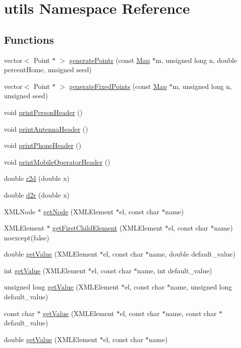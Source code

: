\hypertarget{namespaceutils}{}\section{utils Namespace Reference}
\label{namespaceutils}
\subsection*{Functions}
\begin{DoxyCompactItemize}
\item 
vector$<$ Point $\ast$ $>$ \hyperlink{namespaceutils_a16e957d5c26b39c840f6e109dd19d45d}{generate\+Points} (const \hyperlink{class_map}{Map} $\ast$m, unsigned long n, double percent\+Home, unsigned seed)
\item 
vector$<$ Point $\ast$ $>$ \hyperlink{namespaceutils_acd746b43155fa3033001f28a91a71cec}{generate\+Fixed\+Points} (const \hyperlink{class_map}{Map} $\ast$m, unsigned long n, unsigned seed)
\item 
void \hyperlink{namespaceutils_a1978a6ccb2360773215aba027d8b6f08}{print\+Person\+Header} ()
\item 
void \hyperlink{namespaceutils_a2080e7db5afc5bb1b4c9ef5336f78ccb}{print\+Antenna\+Header} ()
\item 
void \hyperlink{namespaceutils_a7633a4dfe509a009f4e02850b03ba1e4}{print\+Phone\+Header} ()
\item 
void \hyperlink{namespaceutils_a207e9d12cc075f601c7fa32ac010b346}{print\+Mobile\+Operator\+Header} ()
\item 
double \hyperlink{namespaceutils_af70f6f3c2ac66aa3b4ce64a3b48288cb}{r2d} (double x)
\item 
double \hyperlink{namespaceutils_a1d747e438d856e6c46cd1fe558fe3821}{d2r} (double x)
\item 
X\+M\+L\+Node $\ast$ \hyperlink{namespaceutils_a707d0fc1b0346b7da16a6f7714a7f24d}{get\+Node} (X\+M\+L\+Element $\ast$el, const char $\ast$name)
\item 
X\+M\+L\+Element $\ast$ \hyperlink{namespaceutils_a929f9a6daaf5e504356ea4af5918c34b}{get\+First\+Child\+Element} (X\+M\+L\+Element $\ast$el, const char $\ast$name) noexcept(false)
\item 
double \hyperlink{namespaceutils_a90cdccb9260004c67a61003d648b4e14}{get\+Value} (X\+M\+L\+Element $\ast$el, const char $\ast$name, double default\+\_\+value)
\item 
int \hyperlink{namespaceutils_a50983d6cf6c443990ee6d15d8082f2c7}{get\+Value} (X\+M\+L\+Element $\ast$el, const char $\ast$name, int default\+\_\+value)
\item 
unsigned long \hyperlink{namespaceutils_aa81758518e26568880b7d74dc182c75d}{get\+Value} (X\+M\+L\+Element $\ast$el, const char $\ast$name, unsigned long default\+\_\+value)
\item 
const char $\ast$ \hyperlink{namespaceutils_ad69ebe54599ec891b3053cf9f5a1bd63}{get\+Value} (X\+M\+L\+Element $\ast$el, const char $\ast$name, const char $\ast$default\+\_\+value)
\item 
double \hyperlink{namespaceutils_a7347b1fde0bc9f313cd0a7051c33818a}{get\+Value} (X\+M\+L\+Element $\ast$el, const char $\ast$name)
\end{DoxyCompactItemize}
